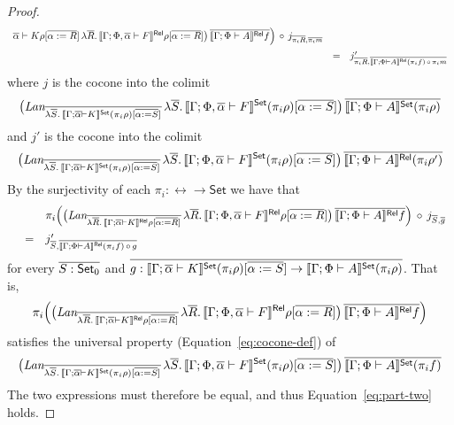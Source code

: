 \documentclass{lmcs}
\theoremstyle{plain}\newtheorem{satz}[thm]{Satz}
\newcommand{\set}{\mathsf{Set}}
\begin{document}
{\begin{proof}
\[\begin{array}{lll}
{{{      \overline{\alpha} 
    \vdash K}\rho[\overline{\alpha := R}]}}\,   
    \lambda \overline{R}.\,\llbracket{\Gamma; \Phi, \overline{\alpha} \vdash
      F}\rrbracket^{\mathsf{Rel}}\rho[\overline{\alpha := R}]\big)\, 
    \overline{\llbracket{\Gamma; \Phi \vdash A}\rrbracket^{\mathsf{Rel}}f} \Big)
\,\circ\, j_{\overline{\pi_i R}, \overline{\pi_i m}} \\[2ex]
& = & j'_{\overline{\pi_i R}, \overline{\llbracket{\Gamma; \Phi \vdash A}\rrbracket^{\mathsf{Rel}}(\pi_i f)
    \,\circ\, \pi_i m}} 
\end{array}\]
where $j$ is the cocone into the colimit
\[
\big(\textit{Lan}_{\ol{\lambda \ol{S}.\,\setsem{\Gamma; \ol\alpha
      \vdash K}(\pi_i \rho)[\ol{\alpha := S}]}}\, \lambda
\ol{S}.\,\setsem{\Gamma; \Phi, \ol\alpha \vdash F}(\pi_i
\rho)[\ol{\alpha := S}]\big)\, \ol{\setsem{\Gamma; \Phi \vdash
    A}(\pi_i \rho)}
\]
and $j'$ is the cocone into the colimit
\[
\big(\textit{Lan}_{\ol{\lambda \ol{S}.\,\setsem{\Gamma; \ol\alpha
      \vdash K}(\pi_i \rho)[\ol{\alpha := S}]}}\, \lambda
\ol{S}.\,\setsem{\Gamma; \Phi, \ol\alpha \vdash F}(\pi_i
\rho)[\ol{\alpha := S}]\big)\, \ol{\relsem{\Gamma; \Phi \vdash
    A}(\pi_i \rho')}
\]
By the surjectivity of each $\pi_i : \rel \to \set$ we have that
\[\begin{array}{lll}
 & & \pi_i \Big( \big(\textit{Lan}_{\overline{\lambda
    \overline{R}.\,\llbracket{\Gamma; \overline{\alpha} \vdash K}\rrbracket^{\mathsf{Rel}}\rho[\overline{\alpha :=
        R}]}}\, \lambda \overline{R}.\,\llbracket{\Gamma; \Phi, \overline{\alpha}
  \vdash F}\rrbracket^{\mathsf{Rel}}\rho[\overline{\alpha := R}]\big)\, \overline{\llbracket{\Gamma; \Phi
    \vdash A}\rrbracket^{\mathsf{Rel}}f} \Big) \,\circ\, j_{\overline{S}, \overline{g}} \\[2ex]
& = & j'_{\overline{S}, \overline{\llbracket{\Gamma; \Phi \vdash A}\rrbracket^{\mathsf{Rel}}(\pi_i f) \,\circ\, g}}
\end{array}\]
for every $\ol{S: \set_0}$ and $\ol{g : \setsem{\Gamma; \ol\alpha
    \vdash K}(\pi_i \rho)[\ol{\alpha := S}] \to \setsem{\Gamma; \Phi
    \vdash A}(\pi_i \rho)}$. That is,
\[\pi_i \Big( \big(\textit{Lan}_{\overline{\lambda
    \overline{R}.\,\llbracket{\Gamma; \overline{\alpha} \vdash K}\rrbracket^{\mathsf{Rel}}\rho[\overline{\alpha :=
        R}]}}\, \lambda \overline{R}.\,\llbracket{\Gamma; \Phi, \overline{\alpha}
  \vdash F}\rrbracket^{\mathsf{Rel}}\rho[\overline{\alpha := R}]\big)\, \overline{\llbracket{\Gamma; \Phi
    \vdash A}\rrbracket^{\mathsf{Rel}}f} \Big)\]
satisfies the universal property (Equation~\ref{eq:cocone-def}) of
\[
\big(\textit{Lan}_{\ol{\lambda \ol{S}.\,\setsem{\Gamma; \ol\alpha
      \vdash K} (\pi_i \rho) [\ol{\alpha := S}]}}\, \lambda
\ol{S}.\,\setsem{\Gamma; \Phi, \ol\alpha \vdash F} (\pi_i \rho)
   [\ol{\alpha := S}]\big)\, \ol{\setsem{\Gamma; \Phi \vdash A} (\pi_i
     f)}
\]
The two expressions must therefore be equal, and thus
Equation~\ref{eq:part-two} holds.
\end{proof}

}
\end{document}
